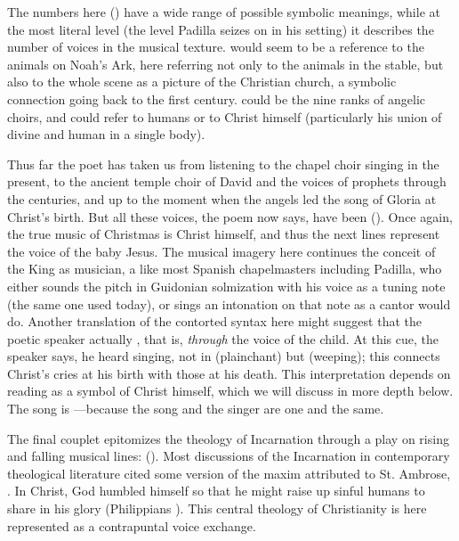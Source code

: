 The numbers here () have a wide
range of possible symbolic meanings, while at the most literal level (the level
Padilla seizes on in his setting) it describes the number of voices in the
musical texture.
 would seem to be a reference to the animals on Noah's Ark,
here referring not only to the animals in the stable, but also to the whole
scene as a picture of the Christian church, a symbolic connection going back to
the first century.
 could be the nine ranks of angelic choirs\citXXX{}, and
 could refer to humans or to Christ himself (particularly his
union of divine and human in a single body).\citXXX

Thus far the poet has taken us from listening to the chapel choir singing in the
present, to the ancient temple choir of David and the voices of prophets through
the centuries, and up to the moment when the angels led the song of Gloria at
Christ's birth.
But all these voices, the poem now says, have been  ().
Once again, the true music of Christmas is Christ himself, and thus the next
lines represent the voice of the baby Jesus.
The musical imagery here continues the conceit of the King as musician, a
 like most Spanish chapelmasters including Padilla,
who either sounds the pitch  in Guidonian solmization with
his voice as a tuning note (the same one used today), or sings an intonation on
that note as a cantor would do.
Another translation of the contorted syntax here might suggest that the poetic
speaker actually , that is,
\emph{through} the voice of the child.
At this cue, the speaker says, he heard singing, not in  (plainchant) but  (weeping); this connects
Christ's cries at his birth with those at his death.\citXXX
This interpretation depends on reading  as a symbol of Christ himself, which we will discuss in more depth below.
The song is ---because
the song and the singer are one and the same.

The final couplet epitomizes the theology of Incarnation through a play on
rising and falling musical lines:  ().
Most discussions of the Incarnation in contemporary theological literature cited
some version of the maxim attributed to St. Ambrose\XXX, . 
In Christ, God humbled himself so that he might raise up sinful humans to share
in his glory (Philippians \XXX). 
This central theology of Christianity is here represented as a contrapuntal
voice exchange.


